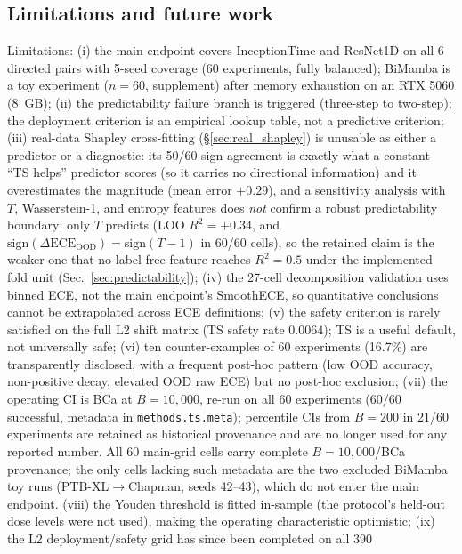 \documentclass[review,12pt,nonatbib]{elsarticle}
\begin{document}
\subsection{Limitations and future work}
Limitations: (i) the main endpoint covers InceptionTime and
ResNet1D on all 6 directed pairs with 5-seed coverage (60 experiments,
fully balanced); BiMamba is a toy experiment ($n=60$, supplement) after
memory exhaustion on an RTX 5060 (8~GB); (ii) the predictability failure
branch is triggered (three-step to two-step); the deployment criterion
is an empirical lookup table, not a predictive criterion; (iii)
real-data Shapley cross-fitting (\S\ref{sec:real_shapley}) is unusable
as either a predictor or a diagnostic: its 50/60 sign agreement is
exactly what a constant ``TS helps'' predictor scores (so it carries no
directional information) and it overestimates the magnitude (mean error
$+0.29$), and a sensitivity analysis with $T$, Wasserstein-1, and
entropy features does \emph{not} confirm a robust predictability
boundary: only $T$ predicts (LOO $R^2=+0.34$, and
$\mathrm{sign}(\Delta\text{ECE}_{\text{OOD}})=\mathrm{sign}(T-1)$ in
60/60 cells), so the retained claim is the weaker one that no
label-free feature reaches $R^2=0.5$ under the implemented fold unit
(Sec.~\ref{sec:predictability}); (iv) the 27-cell decomposition validation uses binned ECE,
not the main endpoint's SmoothECE, so quantitative conclusions cannot be
extrapolated across ECE definitions; (v) the safety criterion is rarely
satisfied on the full L2 shift matrix (TS safety rate $0.0064$); TS is a
useful default, not universally safe; (vi) ten counter-examples of 60
experiments (16.7\%) are transparently disclosed, with a frequent post-hoc pattern
(low OOD accuracy, non-positive decay, elevated OOD raw ECE) but no
post-hoc exclusion; (vii) the operating CI is BCa at $B=10{,}000$,
re-run on all 60 experiments (60/60 successful, metadata in
\texttt{methods.ts.meta}); percentile CIs from $B=200$ in 21/60
experiments are retained as historical provenance and are no longer
used for any reported number. All 60 main-grid cells carry complete
$B=10{,}000$/BCa provenance; the only cells lacking such metadata are
the two excluded BiMamba toy runs
(PTB-XL$\rightarrow$Chapman, seeds 42--43), which do not enter the
main endpoint. (viii)
the Youden threshold is fitted in-sample (the protocol's held-out dose
levels were not used), making the operating characteristic optimistic;
(ix) the L2 deployment/safety grid has since been completed on all 390
\end{document}
